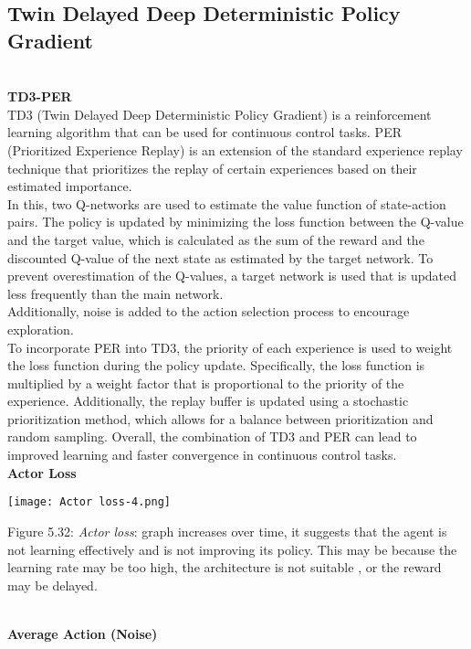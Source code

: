 \documentclass[conference]{IEEEtran}
\begin{document}
\subsection{Twin Delayed Deep Deterministic Policy Gradient}\\

\textbf{TD3-PER}\\

TD3 (Twin Delayed Deep Deterministic Policy Gradient) is a reinforcement learning algorithm that can be used for continuous control tasks. PER (Prioritized Experience Replay) is an extension of the standard experience replay technique that prioritizes the replay of certain experiences based on their estimated importance.\\
In this, two Q-networks are used to estimate the value function of state-action pairs. The policy is updated by minimizing the loss function between the Q-value and the target value, which is calculated as the sum of the reward and the discounted Q-value of the next state as estimated by the target network. To prevent overestimation of the Q-values, a target network is used that is updated less frequently than the main network. \\Additionally, noise is added to the action selection process to encourage exploration.\\
To incorporate PER into TD3, the priority of each experience is used to weight the loss function during the policy update. Specifically, the loss function is multiplied by a weight factor that is proportional to the priority of the experience. Additionally, the replay buffer is updated using a stochastic prioritization method, which allows for a balance between prioritization and random sampling. Overall, the combination of TD3 and PER can lead to improved learning and faster convergence in continuous control tasks.\\

\textbf{Actor Loss}\\

\graphicspath{ {./images/} }
\texttt{[image: Actor loss-4.png]}
\caption{Figure 5.32: \textit{Actor loss}: graph increases over time, it suggests that the agent is not learning effectively and is not improving its policy. This may be because the learning rate may be too high, the architecture is not suitable , or the reward may be delayed.
}\\

\textbf{Average Action (Noise)}\\
\end{document}
